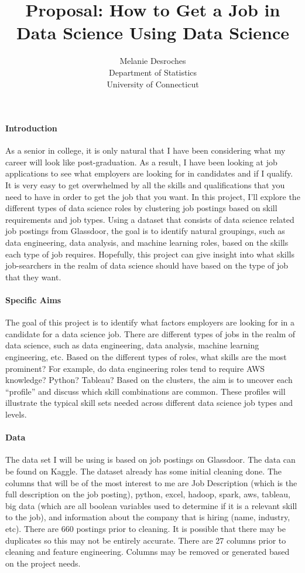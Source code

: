 \documentclass[12pt]{article}
\title{Proposal: How to Get a Job in Data Science Using Data Science}
\author{Melanie Desroches\\
  Department of Statistics\\
  University of Connecticut
}
\begin{document}
\maketitle


\paragraph{Introduction}


As a senior in college, it is only natural that I have been considering what my career will look like post-graduation.
As a result, I have been looking at job applications to see what employers are looking for in candidates and if I qualify. 
It is very easy to get overwhelmed by all the skills and qualifications that you need to have in order to get the job that 
you want. In this project, I’ll explore the different types of data science roles by clustering job postings based on skill 
requirements and job types. Using a dataset that consists of data science related job postings from Glassdoor, the goal is to
identify natural groupings, such as data engineering, data analysis, and machine learning roles, based on the skills each type 
of job requires. Hopefully, this project can give insight into what skills job-searchers in the realm of data science should have
based on the type of job that they want. 

\paragraph{Specific Aims}

The goal of this project is to identify what factors employers are looking for in a candidate for a data science job.
There are different types of jobs in the realm of data science, such as data engineering, data analysis, machine learning 
engineering, etc. Based on the different types of roles, what skills are the most prominent? For example, do data engineering
roles tend to require AWS knowledge? Python? Tableau? Based on the clusters, the aim is to uncover each “profile” and discuss 
which skill combinations are common. These profiles will illustrate the typical skill sets needed across different data science job types 
and levels.

\paragraph{Data}

The data set I will be using is based on job postings on Glassdoor. The data can be found on Kaggle. The dataset already has
some initial cleaning done. The columns that will be of the most interest to me are Job Description (which is the full description
on the job posting), python, excel, hadoop, spark, aws, tableau, big data (which are all boolean variables used to determine
if it is a relevant skill to the job), and information about the company that is hiring (name, industry, etc). There are 660
postings prior to cleaning. It is possible that there may be duplicates so this may not be entirely accurate. There are 27 columns
prior to cleaning and feature engineering. Columns may be removed or generated based on the project needs.
\end{document}
